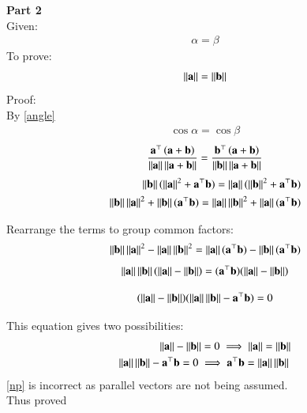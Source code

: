 \documentclass[journal]{IEEEtran}
\begin{document}
	\textbf{Part 2}\\
	Given:
	\begin{align}
		\alpha=\beta
	\end{align}
	To prove:
	\begin{align}
		\norm{\vec{a}} = \norm{\vec{b}} 
	\end{align}
	Proof:\\
	By \eqref{angle}
	\begin{align}
		\cos{\alpha}=\cos{\beta}
	\end{align}
	\begin{align}
		\frac{\vec{a}^\top\brak{\vec{a}+\vec{b}}}{\norm{\vec{a}}\norm{\vec{a}+\vec{b}}} = \frac{\vec{b}^\top\brak{\vec{a}+\vec{b}}}{\norm{\vec{b}}\norm{\vec{a}+\vec{b}}}
	\end{align}
\begin{align}
	\norm{\vec{b}} (\norm{\vec{a}}^2 + \vec{a}^\top\vec{b}) = \norm{\vec{a}} (\norm{\vec{b}}^2 + \vec{a}^\top\vec{b}) \\
	\norm{\vec{b}}\norm{\vec{a}}^2 + \norm{\vec{b}}(\vec{a}^\top\vec{b}) = \norm{\vec{a}}\norm{\vec{b}}^2 + \norm{\vec{a}}(\vec{a}^\top\vec{b})
\end{align}

Rearrange the terms to group common factors:
\begin{align}
	\norm{\vec{b}}\norm{\vec{a}}^2 - \norm{\vec{a}}\norm{\vec{b}}^2 = \norm{\vec{a}}(\vec{a}^\top\vec{b}) - \norm{\vec{b}}(\vec{a}^\top\vec{b})
\end{align}
\begin{align}
	\norm{\vec{a}}\norm{\vec{b}} (\norm{\vec{a}} - \norm{\vec{b}}) = (\vec{a}^\top\vec{b}) (\norm{\vec{a}} - \norm{\vec{b}})
\end{align}

\begin{align}
	(\norm{\vec{a}} - \norm{\vec{b}}) (\norm{\vec{a}}\norm{\vec{b}} - \vec{a}^\top\vec{b}) = 0
\end{align}

This equation gives two possibilities:
\begin{align}
	\norm{\vec{a}} - \norm{\vec{b}} = 0 \implies \norm{\vec{a}} = \norm{\vec{b}}\\
	\norm{\vec{a}}\norm{\vec{b}} - \vec{a}^\top\vec{b} = 0 \implies \vec{a}^\top\vec{b} = \norm{\vec{a}}\norm{\vec{b}}\text{} \label{np}
\end{align}
\eqref{np} is incorrect as parallel vectors are not being assumed.\\
Thus proved
	
\end{document}
